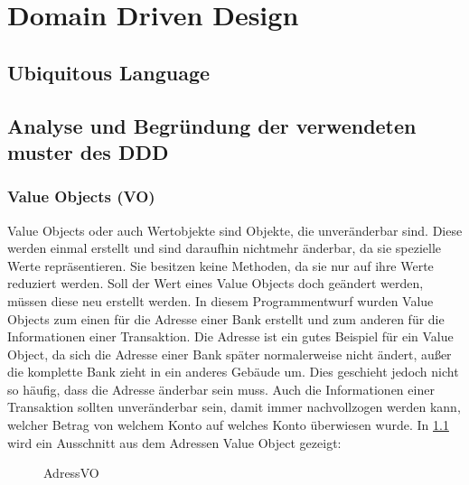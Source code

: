 \chapter{Domain Driven Design}
\section{Ubiquitous Language}
\section{Analyse und Begründung der verwendeten muster des DDD}
\subsection{Value Objects (VO)}
Value Objects oder auch Wertobjekte sind Objekte, die unveränderbar sind. Diese werden einmal erstellt und sind daraufhin nichtmehr änderbar, da sie spezielle Werte repräsentieren. Sie besitzen keine Methoden, da sie nur auf ihre Werte reduziert werden.
Soll der Wert eines Value Objects doch geändert werden, müssen diese neu erstellt werden. In diesem Programmentwurf wurden Value Objects zum einen für die Adresse einer Bank erstellt und zum anderen für die Informationen einer Transaktion. 
Die Adresse ist ein gutes Beispiel für ein Value Object, da sich die Adresse einer Bank später normalerweise nicht ändert, außer die komplette Bank zieht in ein anderes Gebäude um. Dies geschieht jedoch nicht so häufig, dass die 
Adresse änderbar sein muss. Auch die Informationen einer Transaktion sollten unveränderbar sein, damit immer nachvollzogen werden kann, welcher Betrag von welchem Konto auf welches Konto überwiesen wurde. 
\newline In \ref{valueObject} wird ein Ausschnitt aus dem Adressen Value Object gezeigt:
\begin{figure}[htbp]
    \centering
    \caption{\label{valueObject} AdressVO}
\end{figure}
